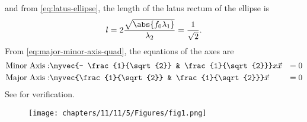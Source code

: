 and 
from
			\eqref{eq:latus-ellipse},
the length of the 
latus rectum of the ellipse is
\begin{align}
	l = 2\frac{\sqrt{\abs{f_0 \lambda_1}}}{\lambda_2} = \frac{1}{\sqrt{2}}.
\end{align}
From 
	  \eqref{eq:major-minor-axis-quad},
	  the equations of the axes are
\begin{align}
	\text{Minor Axis}:&   \myvec{- \frac{1}{\sqrt{2}} & \frac{1}{\sqrt{2}}}x\vec{x} &= 0\\
	\text{Major Axis}:&   \myvec{\frac{1}{\sqrt{2}} & \frac{1}{\sqrt{2}}}\vec{x} &= 0
\end{align}
See  for verification.
%
\begin{figure}[H]
	\centering
	\texttt{[image: chapters/11/11/5/Figures/fig1.png]} 
	\caption{}
	\label{fig:fig1}
\end{figure} 

